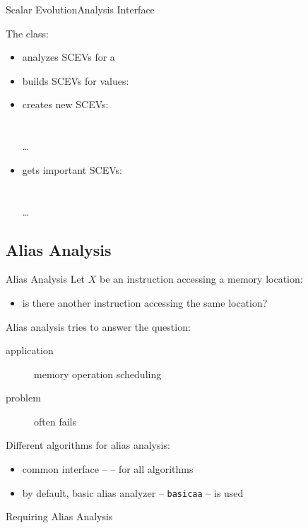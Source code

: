 \begin{frame}{Scalar Evolution}{Analysis Interface}

The  class:

\begin{itemize}
\item analyzes SCEVs for a 
\vfill
\item builds SCEVs for values: \\
\vfill
\item creates new SCEVs: \\
 \\
 \\
\ldots
\vfill
\item gets important SCEVs: \\
       \\
       \\
      \ldots
\end{itemize}
\end{frame}


\subsection{Alias Analysis}


\begin{frame}{Alias Analysis}
Let $X$ be an instruction accessing a memory location:

\begin{itemize}
\item is there another instruction accessing the same location?
\end{itemize}

\vfill
Alias analysis tries to answer the question:

\begin{description}
\item[application] memory operation scheduling
\item[problem] often fails
\end{description}

\vfill
Different algorithms for alias analysis:

\begin{itemize}
\item common interface --  -- for all algorithms
\item by default, basic alias analyzer -- \texttt{basicaa} -- is used
\end{itemize}

\begin{block}{Requiring Alias Analysis}
\centering
{}
\end{block}
\end{frame}


